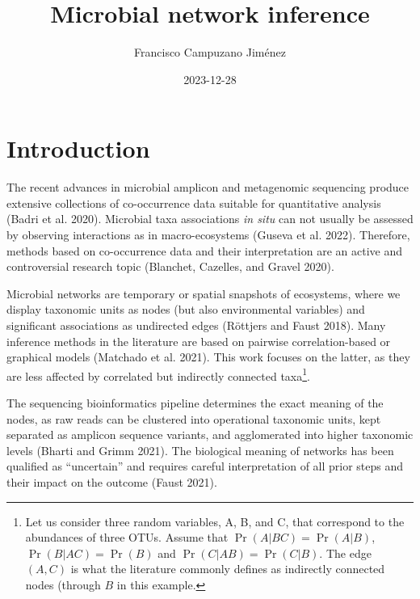 \documentclass[
  a4paper,
]{article}
\title{Microbial network inference}
\author{Francisco Campuzano Jiménez}
\affil{%
                  Bioinformatics Research Centre, Aarhus University
              }
\date{2023-12-28}
\begin{document}
\maketitle
\ifdefined\Shaded\renewenvironment{Shaded}{\begin{tcolorbox}[boxrule=0pt, frame hidden, sharp corners, enhanced, breakable, interior hidden, borderline west={3pt}{0pt}{shadecolor}]}{\end{tcolorbox}}\fi

\newpage
\linenumbers

\hypertarget{introduction}{%
\section{Introduction}\label{introduction}}

The recent advances in microbial amplicon and metagenomic sequencing
produce extensive collections of co-occurrence data suitable for
quantitative analysis (Badri et al. 2020). Microbial taxa associations
\emph{in situ} can not usually be assessed by observing interactions as
in macro-ecosystems (Guseva et al. 2022). Therefore, methods based on
co-occurrence data and their interpretation are an active and
controversial research topic (Blanchet, Cazelles, and Gravel 2020).

Microbial networks are temporary or spatial snapshots of ecosystems,
where we display taxonomic units as nodes (but also environmental
variables) and significant associations as undirected edges (Röttjers
and Faust 2018). Many inference methods in the literature are based on
pairwise correlation-based or graphical models (Matchado et al. 2021).
This work focuses on the latter, as they are less affected by correlated
but indirectly connected taxa\footnote{Let us consider three random
  variables, A, B, and C, that correspond to the abundances of three
  OTUs. Assume that \(\Pr(A |BC) = \Pr(A |B)\), \(\Pr(B |AC) = \Pr(B)\)
  and \(\Pr(C |AB) = \Pr(C |B)\). The edge \((A, C)\) is what the
  literature commonly defines as indirectly connected nodes (through
  \(B\) in this example.}.

The sequencing bioinformatics pipeline determines the exact meaning of
the nodes, as raw reads can be clustered into operational taxonomic
units, kept separated as amplicon sequence variants, and agglomerated
into higher taxonomic levels (Bharti and Grimm 2021). The biological
meaning of networks has been qualified as ``uncertain'' and requires
careful interpretation of all prior steps and their impact on the
outcome (Faust 2021).
\end{document}
